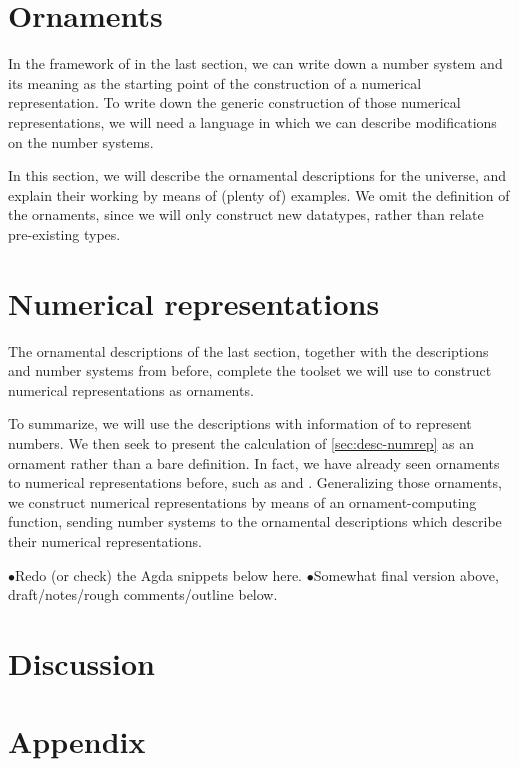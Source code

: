 \documentclass[10pt]{article}
\theoremstyle{plain}
\theoremstyle{definition}
\newcommand{\AF}[1]{\AgdaFunction{#1}}
\newcommand{\AD}[1]{\AgdaDatatype{#1}}
\newcommand{\changed}[1]{\textcolor{git-orange}{$\bullet$#1}}
\begin{document}



\part{Ornaments}\label{part:ornament2_rename_the_other}
% 
In the framework of \AD{DescI} in the last section, we can write down a number system and its meaning as the starting point of the construction of a numerical representation. To write down the generic construction of those numerical representations, we will need a language in which we can describe modifications on the number systems.

In this section, we will describe the ornamental descriptions for the \AD{DescI} universe, and explain their working by means of (plenty of) examples. We omit the definition of the ornaments, since we will only construct new datatypes, rather than relate pre-existing types.





\part{Numerical representations}\label{part:numrep}
% 
The ornamental descriptions of the last section, together with the descriptions and number systems from before, complete the toolset we will use to construct numerical representations as ornaments.

To summarize, we will use the descriptions with information of \AF{Number} to represent numbers. We then seek to present the calculation of \autoref{sec:desc-numrep} as an ornament rather than a bare definition. In fact, we have already seen ornaments to numerical representations before, such as \AF{ListOD} and \AF{RandomOD}. Generalizing those ornaments, we construct numerical representations by means of an ornament-computing function, sending number systems to the ornamental descriptions which describe their numerical representations. 

\changed{Redo (or check) the Agda snippets below here.}
\changed{Somewhat final version above, draft/notes/rough comments/outline below.}


% 
% 

\part{Discussion}
% 












\printbibliography

\part{Appendix}
% 

\end{document}
